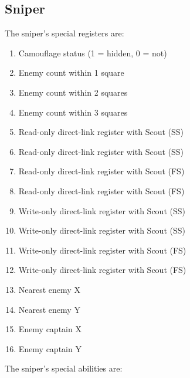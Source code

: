 \documentclass{article}
\begin{document}
\subsection*{Sniper}

The sniper's special registers are:

\begin{enumerate}[noitemsep]
    \item Camouflage status (1 = hidden, 0 = not)
    \item Enemy count within 1 square
    \item Enemy count within 2 squares
    \item Enemy count within 3 squares
    \item Read-only direct-link register with Scout (SS)
    \item Read-only direct-link register with Scout (SS)
    \item Read-only direct-link register with Scout (FS)
    \item Read-only direct-link register with Scout (FS)
    \item Write-only direct-link register with Scout (SS)
    \item Write-only direct-link register with Scout (SS)
    \item Write-only direct-link register with Scout (FS)
    \item Write-only direct-link register with Scout (FS)
    \item Nearest enemy X
    \item Nearest enemy Y
    \item Enemy captain X
    \item Enemy captain Y
\end{enumerate}

The sniper's special abilities are:
\end{document}

